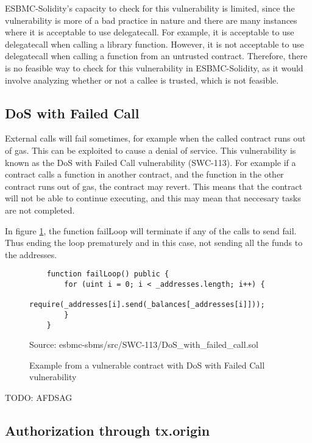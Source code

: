 ESBMC-Solidity's capacity to check for this vulnerability is limited, since the vulnerability is more of a bad practice in nature and there are many instances where it is acceptable to use delegatecall. For example, it is acceptable to use delegatecall when calling a library function. However, it is not acceptable to use delegatecall when calling a function from an untrusted contract. Therefore, there is no feasible way to check for this vulnerability in ESBMC-Solidity, as it would involve analyzing whether or not a callee is trusted, which is not feasible. 

\subsection{DoS with Failed Call}
\label{sec:dos_with_failed_call}

External calls will fail sometimes, for example when the called contract runs out of gas. This can be exploited to cause a denial of service. This vulnerability is known as the DoS with Failed Call vulnerability (SWC-113). For example if a contract calls a function in another contract, and the function in the other contract runs out of gas, the contract may revert. This means that the contract will not be able to continue executing, and this may mean that neccesary tasks are not completed.

In figure \ref{fig:failed_call}, the function failLoop will terminate if any of the calls to send fail. Thus ending the loop prematurely and in this case, not sending all the funds to the addresses. 


\begin{figure}
\begin{lstlisting}
    function failLoop() public {
        for (uint i = 0; i < _addresses.length; i++) {
            require(_addresses[i].send(_balances[_addresses[i]]));
        }
    }
\end{lstlisting}
\caption{Example from a vulnerable contract with DoS with Failed Call vulnerability}
\label{fig:failed_call}
Source: esbmc-sbms/src/SWC-113/DoS\_with\_failed\_call.sol
\end{figure}

TODO: AFDSAG

\subsection{Authorization through tx.origin}
\label{sec:authorization_through_tx.origin}

